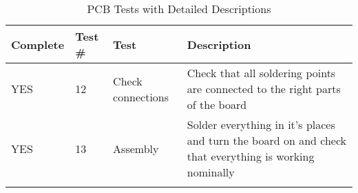 \begin{longtable}{|m{}|m{}|m{}|m{}|}
\hline
Complete & Test \# & Test & Description \\ \hline
YES & 12 & Check connections & Check that all soldering points are connected to the right parts of the board \\ \hline
YES & 13 & Assembly & Solder everything in it's places and turn the board on and check that everything is working nominally
\\ \hline
\caption{PCB Tests with Detailed Descriptions}
\label{tab:test33-result-PCB-Tests}
\end{longtable}